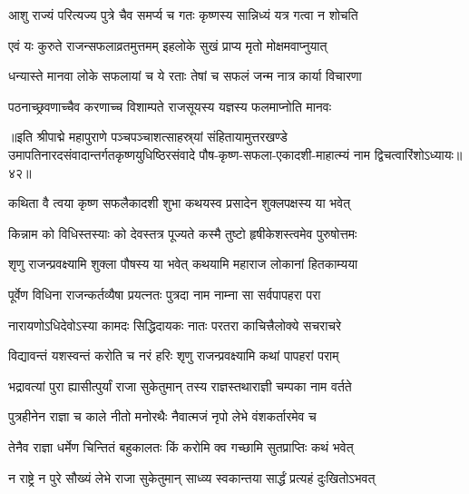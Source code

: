 \twolineshloka
{आशु राज्यं परित्यज्य पुत्रे चैव समर्प्य च}
{गतः कृष्णस्य सान्निध्यं यत्र गत्वा न शोचति}%

\twolineshloka
{एवं यः कुरुते राजन्सफलाव्रतमुत्तमम्}
{इहलोके सुखं प्राप्य मृतो मोक्षमवाप्नुयात्}%

\twolineshloka
{धन्यास्ते मानवा लोके सफलायां च ये रताः}
{तेषां च सफलं जन्म नात्र कार्या विचारणा}%

\twolineshloka
{पठनाच्छ्रवणाच्चैव करणाच्च विशाम्पते}
{राजसूयस्य यज्ञस्य फलमाप्नोति मानवः}%

॥इति श्रीपाद्मे महापुराणे पञ्चपञ्चाशत्साहस्र्यां संहितायामुत्तरखण्डे उमापतिनारदसंवादान्तर्गतकृष्णयुधिष्ठिरसंवादे पौष-कृष्ण-सफला-एकादशी-माहात्म्यं नाम द्विचत्वारिंशोऽध्यायः॥४२॥

\hyperref[sec:ekadashi_mahatmyam_padma_puranam]{\closesub}
\clearpage

\label{sec:padma-pausha-shukla-putrada}



\twolineshloka
{कथिता वै त्वया कृष्ण सफलैकादशी शुभा}
{कथयस्व प्रसादेन शुक्लपक्षस्य या भवेत्}%

\twolineshloka
{किन्नाम को विधिस्तस्याः को देवस्तत्र पूज्यते}
{कस्मै तुष्टो हृषीकेशस्त्वमेव पुरुषोत्तमः}%


\twolineshloka
{शृणु राजन्प्रवक्ष्यामि शुक्ला पौषस्य या भवेत्}
{कथयामि महाराज लोकानां हितकाम्यया}%

\twolineshloka
{पूर्वेण विधिना राजन्कर्तव्यैषा प्रयत्नतः}
{पुत्रदा नाम नाम्ना सा सर्वपापहरा परा}%

\twolineshloka
{नारायणोऽधिदेवोऽस्या कामदः सिद्धिदायकः}
{नातः परतरा काचित्त्रैलोक्ये सचराचरे}%

\twolineshloka
{विद्यावन्तं यशस्वन्तं करोति च नरं हरिः}
{शृणु राजन्प्रवक्ष्यामि कथां पापहरां पराम्}%

\twolineshloka
{भद्रावत्यां पुरा ह्यासीत्पुर्यां राजा सुकेतुमान्}
{तस्य राज्ञस्तथाराज्ञी चम्पका नाम वर्तते}%

\twolineshloka
{पुत्रहीनेन राज्ञा च काले नीतो मनोरथैः}
{नैवात्मजं नृपो लेभे वंशकर्तारमेव च}%

\twolineshloka
{तेनैव राज्ञा धर्मेण चिन्तितं बहुकालतः}
{किं करोमि क्व गच्छामि सुतप्राप्तिः कथं भवेत्}%

\twolineshloka
{न राष्ट्रे न पुरे सौख्यं लेभे राजा सुकेतुमान्}
{साध्व्य स्वकान्तया सार्द्धं प्रत्यहं दुःखितोऽभवत्}%

